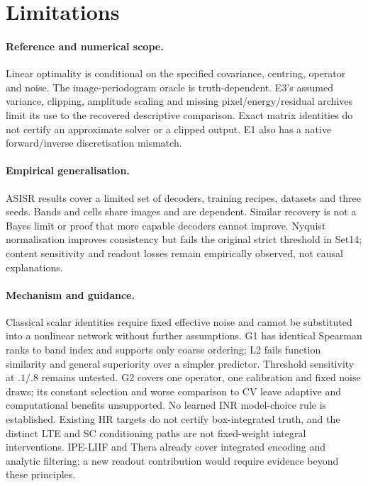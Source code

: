 \section{Limitations}\label{sec:limits}
\paragraph{Reference and numerical scope.} Linear optimality is conditional on the specified covariance, centring, operator and noise. The image-periodogram oracle is truth-dependent. E3's assumed variance, clipping, amplitude scaling and missing pixel/energy/residual archives limit its use to the recovered descriptive comparison. Exact matrix identities do not certify an approximate solver or a clipped output. E1 also has a native forward/inverse discretisation mismatch.

\paragraph{Empirical generalisation.} ASISR results cover a limited set of decoders, training recipes, datasets and three seeds. Bands and cells share images and are dependent. Similar recovery is not a Bayes limit or proof that more capable decoders cannot improve. Nyquist normalisation improves consistency but fails the original strict threshold in Set14; content sensitivity and readout losses remain empirically observed, not causal explanations.

\paragraph{Mechanism and guidance.} Classical scalar identities require fixed effective noise and cannot be substituted into a nonlinear network without further assumptions. G1 has identical Spearman ranks to band index and supports only coarse ordering; L2 fails function similarity and general superiority over a simpler predictor. Threshold sensitivity at $.1/.8$ remains untested. G2 covers one operator, one calibration and fixed noise draws; its constant selection and worse comparison to CV leave adaptive and computational benefits unsupported. No learned INR model-choice rule is established. Existing HR targets do not certify box-integrated truth, and the distinct LTE and SC conditioning paths are not fixed-weight integral interventions. IPE-LIIF and Thera already cover integrated encoding and analytic filtering; a new readout contribution would require evidence beyond these principles.

